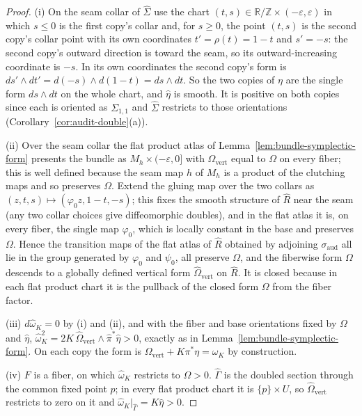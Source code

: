 \begin{proof}
(i) On the seam collar of $\hat\Sigma$ use the chart
$(t,s)\in\mathbb R/\mathbb Z\times(-\varepsilon,\varepsilon)$ in which
$s\le0$ is the first copy's collar and, for $s\ge0$, the point $(t,s)$ is the
second copy's collar point with its own coordinates $t'=\rho(t)=1-t$ and
$s'=-s$: the second copy's outward direction is toward the seam, so its
outward-increasing coordinate is $-s$.  In its own coordinates the second
copy's form is $ds'\wedge dt'=d(-s)\wedge d(1-t)=ds\wedge dt$.  So the two
copies of $\eta$ are the single form $ds\wedge dt$ on the whole chart, and
$\hat\eta$ is smooth.  It is positive on both copies since each is oriented
as $\Sigma_{1,1}$ and $\hat\Sigma$ restricts to those orientations
(Corollary~\ref{cor:audit-double}(a)).

(ii) Over the seam collar the flat product atlas of
Lemma~\ref{lem:bundle-symplectic-form} presents the bundle as
$M_h\times(-\varepsilon,0]$ with $\Omega_{\mathrm{vert}}$ equal to $\Omega$
on every fiber; this is well defined because the seam map $h$ of $M_h$ is a
product of the clutching maps and so preserves $\Omega$.  Extend the gluing map over the two collars as
$(z,t,s)\mapsto(\varphi_0 z,1-t,-s)$; this fixes the smooth structure of
$\hat R$ near the seam (any two collar choices give diffeomorphic doubles),
and in the flat atlas it is, on every fiber, the single map $\varphi_0$,
which is locally constant in the base and preserves $\Omega$.  Hence the transition maps of the flat atlas of $\hat R$
obtained by adjoining $\sigma_{\mathrm{aud}}$ all lie in the group generated
by $\varphi_0$ and $\psi_0$, all preserve $\Omega$, and the fiberwise form
$\Omega$ descends to a globally defined vertical form
$\hat\Omega_{\mathrm{vert}}$ on $\hat R$.  It is closed because in each flat
product chart it is the pullback of the closed form $\Omega$ from the fiber
factor.

(iii) $d\hat\omega_K=0$ by (i) and (ii), and with the fiber and base
orientations fixed by $\Omega$ and $\hat\eta$,
$\hat\omega_K^2=2K\,\hat\Omega_{\mathrm{vert}}\wedge\hat\pi^*\hat\eta>0$,
exactly as in Lemma~\ref{lem:bundle-symplectic-form}.  On each copy the form
is $\Omega_{\mathrm{vert}}+K\pi^*\eta=\omega_K$ by construction.

(iv) $F$ is a fiber, on which $\hat\omega_K$ restricts to $\Omega>0$.
$\hat\Gamma$ is the doubled section through the common fixed point $p$; in
every flat product chart it is $\{p\}\times U$, so
$\hat\Omega_{\mathrm{vert}}$ restricts to zero on it and
$\hat\omega_K|_{\hat\Gamma}=K\hat\eta>0$.


\end{proof}
